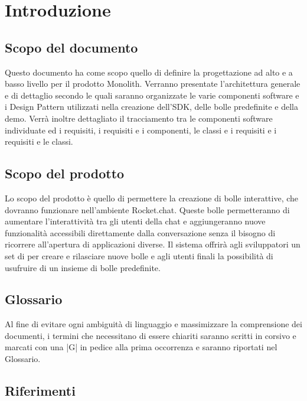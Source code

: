 
\section{Introduzione}
\subsection{Scopo del documento}

Questo documento ha come scopo quello di definire la progettazione ad
alto  e a basso livello
per il prodotto Monolith. Verranno presentate l'architettura generale e
di dettaglio secondo le quali
saranno organizzate le varie componenti software e i Design Pattern utilizzati nella
creazione dell'SDK, delle bolle predefinite e della demo. Verrà
inoltre dettagliato il tracciamento tra le componenti software
individuate ed i requisiti, i requisiti e i componenti, le classi e i
requisiti e i requisiti e le classi.


\subsection{Scopo del prodotto}

Lo scopo del prodotto è quello di permettere la creazione di bolle
interattive, che dovranno funzionare nell'ambiente Rocket.chat. Queste
bolle permetteranno di aumentare l'interattività tra gli utenti della
chat e aggiungeranno nuove funzionalità accessibili direttamente dalla conversazione 
senza il bisogno di ricorrere all'apertura di applicazioni diverse.
Il sistema offrirà agli sviluppatori un set di  per creare e
rilasciare nuove bolle e agli utenti finali la possibilità di
usufruire di un insieme di bolle predefinite.


\subsection{Glossario}

Al fine di evitare ogni ambiguità di linguaggio e massimizzare la
comprensione dei documenti, i termini che necessitano di essere
chiariti saranno scritti in corsivo e marcati con una |G| in pedice alla prima
occorrenza e saranno riportati nel Glossario.

\subsection{Riferimenti}

